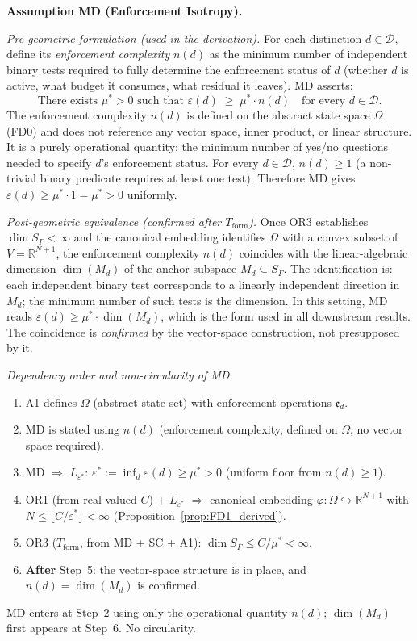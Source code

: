 \documentclass[11pt]{article}
\theoremstyle{remark}
\begin{document}
\smallskip\noindent\textbf{Assumption MD (Enforcement Isotropy).}
\label{assumption:MD}

\textit{Pre-geometric formulation (used in the derivation).}  For each distinction $d \in \mathcal{D}$, define its \emph{enforcement complexity} $n(d)$ as the minimum number of independent binary tests required to fully determine the enforcement status of $d$ (whether $d$ is active, what budget it consumes, what residual it leaves).  MD asserts:
\[
\boxed{\text{There exists } \mu^* > 0 \text{ such that } \varepsilon(d) \;\geq\; \mu^* \cdot n(d) \quad \text{for every } d \in \mathcal{D}.}
\]
The enforcement complexity $n(d)$ is defined on the abstract state space $\Omega$ (FD0) and does not reference any vector space, inner product, or linear structure.  It is a purely operational quantity: the minimum number of yes/no questions needed to specify $d$'s enforcement status.  For every $d \in \mathcal{D}$, $n(d) \ge 1$ (a non-trivial binary predicate requires at least one test).  Therefore MD gives $\varepsilon(d) \ge \mu^* \cdot 1 = \mu^* > 0$ uniformly.

\textit{Post-geometric equivalence (confirmed after $T_{\mathrm{form}}$).}  Once OR3 establishes $\dim S_\Gamma < \infty$ and the canonical embedding identifies $\Omega$ with a convex subset of $V = \mathbb{R}^{N+1}$, the enforcement complexity $n(d)$ coincides with the linear-algebraic dimension $\dim(M_d)$ of the anchor subspace $M_d \subseteq S_\Gamma$.  The identification is: each independent binary test corresponds to a linearly independent direction in $M_d$; the minimum number of such tests is the dimension.  In this setting, MD reads $\varepsilon(d) \ge \mu^* \cdot \dim(M_d)$, which is the form used in all downstream results.  The coincidence is \emph{confirmed} by the vector-space construction, not presupposed by it.

\smallskip\noindent\textit{Dependency order and non-circularity of MD.}
\begin{enumerate}[nosep,leftmargin=2em,itemsep=2pt]
\item A1 defines $\Omega$ (abstract state set) with enforcement operations $\mathfrak{e}_d$.
\item MD is stated using $n(d)$ (enforcement complexity, defined on $\Omega$, no vector space required).
\item MD $\Rightarrow$ $L_{\varepsilon^*}$: $\varepsilon^* := \inf_d \varepsilon(d) \ge \mu^* > 0$ (uniform floor from $n(d) \ge 1$).
\item OR1 (from real-valued $C$) $+$ $L_{\varepsilon^*}$ $\Rightarrow$ canonical embedding $\varphi: \Omega \hookrightarrow \mathbb{R}^{N+1}$ with $N \le \lfloor C/\varepsilon^* \rfloor < \infty$ (Proposition~\ref{prop:FD1_derived}).
\item OR3 ($T_{\mathrm{form}}$, from MD + SC + A1): $\dim S_\Gamma \le C/\mu^* < \infty$.
\item \textbf{After} Step~5: the vector-space structure is in place, and $n(d) = \dim(M_d)$ is confirmed.
\end{enumerate}
\noindent MD enters at Step~2 using only the operational quantity $n(d)$; $\dim(M_d)$ first appears at Step~6.  No circularity.
\end{document}
